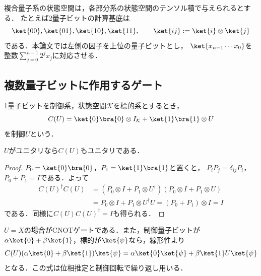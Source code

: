 複合量子系の状態空間は，各部分系の状態空間のテンソル積で与えられるとする．
たとえば2量子ビットの計算基底は
\[
 \ket{00},\ket{01},\ket{10},\ket{11},
 \qquad \ket{ij}:=\ket{i}\otimes\ket{j}
\]
である．本論文では左側の因子を上位の量子ビットとし，
$\ket{x_{n-1}\cdots x_0}$を整数$\sum_{j=0}^{n-1}2^jx_j$に対応させる．

\subsection{複数量子ビットに作用するゲート}

\begin{defi}[制御ユニタリ]
1量子ビットを制御系，状態空間$\mathcal K$を標的系とするとき，
\begin{equation}
 C(U)=\ket{0}\bra{0}\otimes I_{\mathcal K}
      +\ket{1}\bra{1}\otimes U
 \label{eq:controlled-unitary}
\end{equation}
を制御$U$という．
\end{defi}

\begin{prop}
$U$がユニタリなら$C(U)$もユニタリである．
\end{prop}
\begin{proof}
$P_0=\ket{0}\bra{0}$，$P_1=\ket{1}\bra{1}$と置くと，
$P_iP_j=\delta_{ij}P_i$，$P_0+P_1=I$である．よって
\begin{align*}
 C(U)^\dagger C(U)
 &=(P_0\otimes I+P_1\otimes U^\dagger)
   (P_0\otimes I+P_1\otimes U)\\
 &=P_0\otimes I+P_1\otimes U^\dagger U
  =(P_0+P_1)\otimes I=I
\end{align*}
である．同様に$C(U)C(U)^\dagger=I$も得られる．
\end{proof}

$U=X$の場合がCNOTゲートである．また，制御量子ビットが
$\alpha\ket{0}+\beta\ket{1}$，標的が$\ket{\psi}$なら，線形性より
\begin{equation}
 C(U)(\alpha\ket{0}+\beta\ket{1})\ket{\psi}
 =\alpha\ket{0}\ket{\psi}+\beta\ket{1}U\ket{\psi}
 \label{eq:controlled-unitary-superposition}
\end{equation}
となる．この式は位相推定と制御回転で繰り返し用いる．
